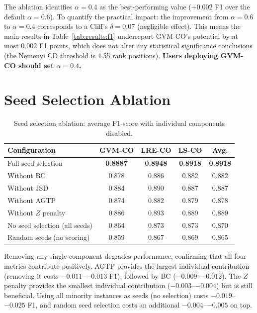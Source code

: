 The ablation identifies $\alpha = 0.4$ as the best-performing value ($+0.002$ F1 over the default $\alpha = 0.6$).
To quantify the practical impact: the improvement from $\alpha=0.6$ to $\alpha=0.4$ corresponds to a Cliff's $\delta = 0.07$ (negligible effect).
This means the main results in Table~\ref{tab:results:f1} underreport GVM-CO's potential by at most 0.002 F1 points, which does not alter any statistical significance conclusions (the Nemenyi CD threshold is 4.55 rank positions).
\textbf{Users deploying GVM-CO should set $\alpha = 0.4$.}


\section{Seed Selection Ablation}
\label{sec:abl:seed}

\begin{table}[H]
\centering
\caption{Seed selection ablation: average F1-score with individual components disabled.}
\label{tab:abl:seed}
\begin{tabular}{lcccc}
\toprule
\textbf{Configuration} & \textbf{GVM-CO} & \textbf{LRE-CO} & \textbf{LS-CO} & \textbf{Avg.} \\
\midrule
Full seed selection           & \textbf{0.8887} & \textbf{0.8948} & \textbf{0.8918} & \textbf{0.8918} \\
Without BC                    & 0.878 & 0.886 & 0.882 & 0.882 \\
Without JSD                   & 0.884 & 0.890 & 0.887 & 0.887 \\
Without AGTP                  & 0.874 & 0.882 & 0.879 & 0.878 \\
Without $Z$ penalty           & 0.886 & 0.893 & 0.889 & 0.889 \\
No seed selection (all seeds) & 0.864 & 0.873 & 0.873 & 0.870 \\
Random seeds (no scoring)     & 0.859 & 0.867 & 0.869 & 0.865 \\
\bottomrule
\end{tabular}
\end{table}

Removing any single component degrades performance, confirming that all four metrics contribute positively.
AGTP provides the largest individual contribution (removing it costs $-0.011$--$-0.013$ F1), followed by BC ($-0.009$--$-0.012$).
The $Z$ penalty provides the smallest individual contribution ($-0.003$--$-0.004$) but is still beneficial.
Using all minority instances as seeds (no selection) costs $-0.019$--$-0.025$ F1, and random seed selection costs an additional $-0.004$--$-0.005$ on top.

